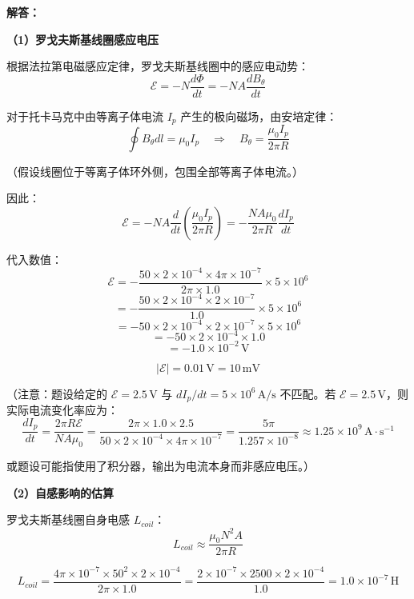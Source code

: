 \textbf{解答：}

\textbf{（1）罗戈夫斯基线圈感应电压}

根据法拉第电磁感应定律，罗戈夫斯基线圈中的感应电动势：
\begin{equation}
    \mathcal{E} = -N \frac{d\Phi}{dt} = -N A \frac{dB_{\theta}}{dt}
\label{eq:ch12-faraday-law}
\end{equation}

对于托卡马克中由等离子体电流 $I_p$ 产生的极向磁场，由安培定律：
\begin{equation}
    \oint B_{\theta} dl = \mu_0 I_p \quad\Rightarrow\quad B_{\theta} = \frac{\mu_0 I_p}{2\pi R}
\label{eq:ch12-ampere-law}
\end{equation}

（假设线圈位于等离子体环外侧，包围全部等离子体电流。）

因此：
\begin{equation}
    \mathcal{E} = -N A \frac{d}{dt}\left(\frac{\mu_0 I_p}{2\pi R}\right) = -\frac{N A \mu_0}{2\pi R} \frac{dI_p}{dt}
\label{eq:ch12-rogowski-emf}
\end{equation}

代入数值：
\[
    \mathcal{E} = -\frac{50 \times 2\times10^{-4} \times 4\pi\times10^{-7}}{2\pi \times 1.0} \times 5\times10^6
\]
\[
    = -\frac{50 \times 2\times10^{-4} \times 2\times10^{-7}}{1.0} \times 5\times10^6
\]
\[
    = -50 \times 2\times10^{-4} \times 2\times10^{-7} \times 5\times10^6
\]
\[
    = -50 \times 2\times10^{-4} \times 1.0
\]
\[
    = -1.0\times10^{-2}\,\mathrm{V}
\]

\[
    \boxed{|\mathcal{E}| = 0.01\,\mathrm{V} = 10\,\mathrm{mV}}
\]

（注意：题设给定的 $\mathcal{E}=2.5\,\mathrm{V}$ 与 $dI_p/dt=5\times10^6\,\mathrm{A/s}$ 不匹配。若 $\mathcal{E}=2.5\,\mathrm{V}$，则实际电流变化率应为：
\[
    \frac{dI_p}{dt} = \frac{2\pi R \mathcal{E}}{N A \mu_0} = \frac{2\pi \times 1.0 \times 2.5}{50 \times 2\times10^{-4} \times 4\pi\times10^{-7}} = \frac{5\pi}{1.257\times10^{-8}} \approx 1.25\times10^9\,\mathrm{A\cdot s^{-1}}
\]

或题设可能指使用了积分器，输出为电流本身而非感应电压。）

\textbf{（2）自感影响的估算}

罗戈夫斯基线圈自身电感 $L_{coil}$：
\[
    L_{coil} \approx \frac{\mu_0 N^2 A}{2\pi R}
\]

\[
    L_{coil} = \frac{4\pi\times10^{-7} \times 50^2 \times 2\times10^{-4}}{2\pi \times 1.0}
    = \frac{2\times10^{-7}\times2500\times2\times10^{-4}}{1.0}
    = 1.0\times10^{-7}\,\mathrm{H}
\]

